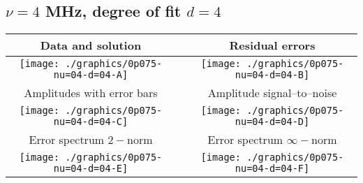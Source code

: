 

% 

\clearpage{}
\break{}

\subsection{$\nu = 4$ MHz, degree of fit $d = 4$}

\begin{table}[h]
    \begin{center}
        \begin{tabular}{ccc}
            Data and solution & \quad & Residual errors \\\hline
            \texttt{[image: ./graphics/0p075-nu=04-d=04-A]} &&
            \texttt{[image: ./graphics/0p075-nu=04-d=04-B]} \\[15pt]
            Amplitudes with error bars && Amplitude signal--to--noise \\\hline
            \texttt{[image: ./graphics/0p075-nu=04-d=04-C]} &&
            \texttt{[image: ./graphics/0p075-nu=04-d=04-D]} \\[15pt]
            Error spectrum $2-$norm && Error spectrum $\infty-$norm \\\hline
            \texttt{[image: ./graphics/0p075-nu=04-d=04-E]} &&
            \texttt{[image: ./graphics/0p075-nu=04-d=04-F]} \\[15pt]
        \end{tabular}
    \end{center}
\label{fig:elev=75, nu=4}
\end{table}



\endinput
